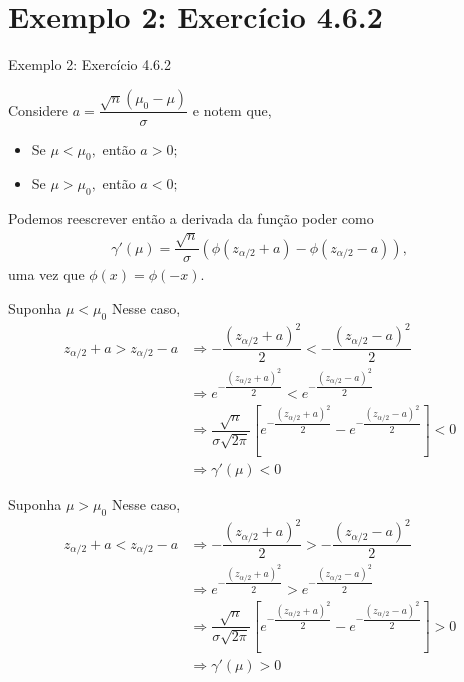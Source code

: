 \documentclass[12pt]{beamer}
\begin{document}
\section{Exemplo 2: Exercício 4.6.2}
\begin{frame}{Exemplo 2: Exercício 4.6.2}
\begin{block}{}
\justifying
Considere $a=\dfrac{\sqrt{n}(\mu_0 - \mu)}{\sigma}$ e notem que,
\begin{itemize}
    \item Se $\mu<\mu_{0},$ então $a>0;$
    \pause
    \item Se $\mu>\mu_{0},$ então $a<0;$
\end{itemize}
\end{block}
\pause 
\begin{block}{}
\justifying
Podemos reescrever então a derivada da função poder como
\begin{align*}
\gamma'(\mu) = \dfrac{\sqrt{n}}{\sigma} \left(\phi\left( z_{\alpha/2}+a\right) - \phi\left(z_{\alpha/2}-a\right)\right),
\end{align*}
uma vez que $\phi(x)=\phi(-x).$ 
\end{block}
\end{frame}

\begin{frame}{}
\begin{block}{Suponha $\mu<\mu_{0}$}
\justifying
Nesse caso, 
\begin{align*}
    z_{\alpha/2}+a>z_{\alpha/2}-a&\Rightarrow -\dfrac{(z_{\alpha/2}+a)^{2}}{2}<-\dfrac{(z_{\alpha/2}-a)^{2}}{2}\\
    &\Rightarrow e^{-\dfrac{(z_{\alpha/2}+a)^{2}}{2}} < e^{-\dfrac{(z_{\alpha/2}-a)^{2}}{2}}\\
    &\Rightarrow \dfrac{\sqrt{n}}{\sigma\sqrt{2\pi}}\left[e^{-\dfrac{(z_{\alpha/2}+a)^{2}}{2}}-e^{-\dfrac{(z_{\alpha/2}-a)^{2}}{2}}\right]<0\\
    &\Rightarrow \gamma'(\mu)<0
\end{align*}
\end{block}
\end{frame}


\begin{frame}{}
\begin{block}{Suponha $\mu>\mu_{0}$}
\justifying
Nesse caso, 
\begin{align*}
    z_{\alpha/2}+a<z_{\alpha/2}-a&\Rightarrow -\dfrac{(z_{\alpha/2}+a)^{2}}{2}>-\dfrac{(z_{\alpha/2}-a)^{2}}{2}\\
    &\Rightarrow e^{-\dfrac{(z_{\alpha/2}+a)^{2}}{2}} > e^{-\dfrac{(z_{\alpha/2}-a)^{2}}{2}}\\
    &\Rightarrow \dfrac{\sqrt{n}}{\sigma\sqrt{2\pi}}\left[e^{-\dfrac{(z_{\alpha/2}+a)^{2}}{2}}-e^{-\dfrac{(z_{\alpha/2}-a)^{2}}{2}}\right]>0\\
    &\Rightarrow \gamma'(\mu)>0
\end{align*}
\end{block}
\end{frame}
\end{document}
